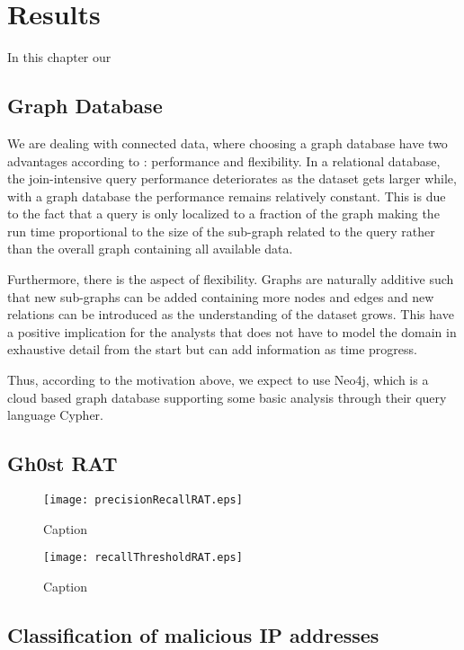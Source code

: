 \chapter{Results}
In this chapter our 

\section{Graph Database}
We are dealing with connected data, where choosing a graph database have two advantages according to \citet{robinson2013}: performance and flexibility. In a relational database, the join-intensive query performance deteriorates as the dataset gets larger while, with a graph database the performance remains relatively constant. This is due to the fact that a query is only localized to a fraction of the graph making the run time proportional to the size of the sub-graph related to the query rather than the overall graph containing all available data.

Furthermore, there is the aspect of flexibility. Graphs are naturally additive \cite{robinson2013} such that new sub-graphs can be added containing more nodes and edges and new relations can be introduced as the understanding of the dataset grows. This have a positive implication for the analysts that does not have to model the domain in exhaustive detail from the start but can add information as time progress. 

Thus, according to the motivation above, we expect to use Neo4j, which is a cloud based graph database supporting some basic analysis through their query language Cypher.

\section{Gh0st RAT}

\begin{figure}[h!]
    \centering
    \texttt{[image: precisionRecallRAT.eps]}
    \caption{Caption}
    \label{fig:my_label}
\end{figure}

\begin{figure}[h!]
    \centering
    \texttt{[image: recallThresholdRAT.eps]}
    \caption{Caption}
    \label{fig:my_label}
\end{figure}

\section{Classification of malicious IP addresses}

